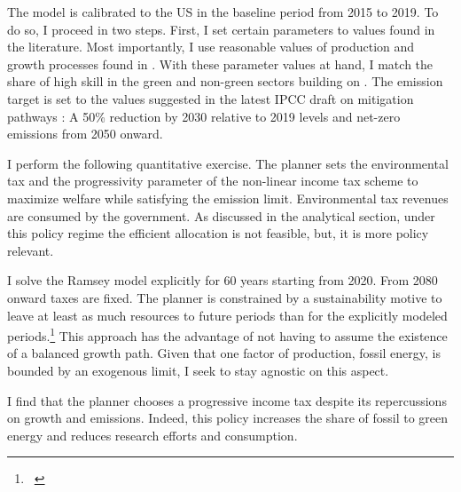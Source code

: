 The model is calibrated to the US in the baseline period from 2015 to 2019. To do so, I proceed in two steps. First, I set certain parameters to values found in the literature. Most importantly, I use reasonable values of production and growth processes found in \cite{Fried2018ClimateAnalysis}. %
With these parameter values at hand, I match the share of high skill in the green and non-green sectors building on \cite{Consoli2016DoCapital}. The emission target is set to the values suggested in the latest IPCC draft on mitigation pathways \citep{IPCC2022}: A 50\% reduction by 2030 relative to 2019 levels and  net-zero emissions from 2050 onward.

I perform the following quantitative exercise. 
 The planner sets the environmental tax and the progressivity parameter of the non-linear income tax scheme to maximize welfare while satisfying the emission limit. Environmental tax revenues are consumed by the government. As discussed in the analytical section, under this policy regime the efficient allocation is not feasible, but, it is  more policy relevant. 

I solve the Ramsey model explicitly for 60 years starting from 2020. From 2080 onward taxes are fixed. The planner is constrained by a sustainability motive to leave at least as much resources to future periods than for the explicitly modeled periods.\footnote{\ }
This approach has the advantage of not having to assume the existence of a balanced growth path. Given that one factor of production, fossil energy, is bounded by an exogenous limit, I seek to stay agnostic on this aspect.

I find that the planner chooses a progressive income tax despite its repercussions on growth and emissions. Indeed, this policy increases the share of fossil to green energy and reduces research efforts and consumption. %
 

